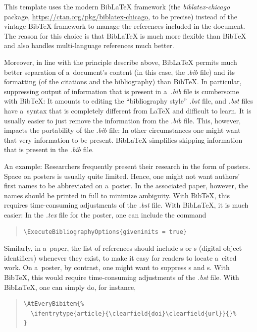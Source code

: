 This template uses the modern BibLaTeX framework (the \textit{biblatex-chicago} package, \url{https://ctan.org/pkg/biblatex-chicago}, to be precise) instead of the vintage BibTeX framework to manage the references included in the document. The reason for this choice is that BibLaTeX is much more flexible than BibTeX and also handles multi-language references much better.

Moreover, in line with the principle describe above, BibLaTeX permits much better separation of a~document's content (in this case, the \textit{.bib} file) and its formatting (of the citations and the bibliography) than BibTeX. In particular, suppressing output of information that is present in a~\textit{.bib} file is cumbersome with BibTeX: It amounts to editing the ``bibliography style'' \textit{.bst} file, and \textit{.bst} files have a~syntax that is completely different from LaTeX and difficult to learn. It is usually easier to just remove the information from the \textit{.bib} file. This, however, impacts the portability of the \textit{.bib} file: In other circumstances one might want that very information to be present. BibLaTeX simplifies skipping information that is present in the \textit{.bib} file.

An example: Researchers frequently present their research in the form of posters. Space on posters is usually quite limited. Hence, one might not want authors' first names to be abbreviated on a~poster. In the associated paper, however, the names should be printed in full to minimize ambiguity. With BibTeX, this requires time-consuming adjustments of the \textit{.bst} file. With BibLaTeX, it is much easier: In the \textit{.tex} file for the poster, one can include the command
\begin{quote}
	\verb|\ExecuteBibliographyOptions{giveninits = true}|
\end{quote}

Similarly, in a~paper, the list of references should include s or s (digital object identifiers) whenever they exist, to make it easy for readers to locate a~cited work. On a~poster, by contrast, one might want to suppress s and s. With BibTeX, this would require time-consuming adjustments of the \textit{.bst} file. With BibLaTeX, one can simply do, for instance,
\begin{quote}
\begin{verbatim}
\AtEveryBibitem{%
  \ifentrytype{article}{\clearfield{doi}\clearfield{url}}{}%
}
\end{verbatim}
\end{quote}

